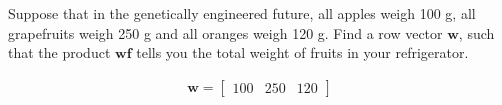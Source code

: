 Suppose that in the genetically engineered future, all apples weigh 100 g, all grapefruits weigh 250 g and all oranges weigh 120 g. Find a row vector $\boldsymbol{w}$, such that the product $\boldsymbol{wf}$ tells you the total weight of fruits in your refrigerator.

\begin{solution}
\begin{align*}
    \boldsymbol{w} = \begin{bmatrix}
    100 & 250 & 120
    \end{bmatrix}
\end{align*}
\end{solution}
